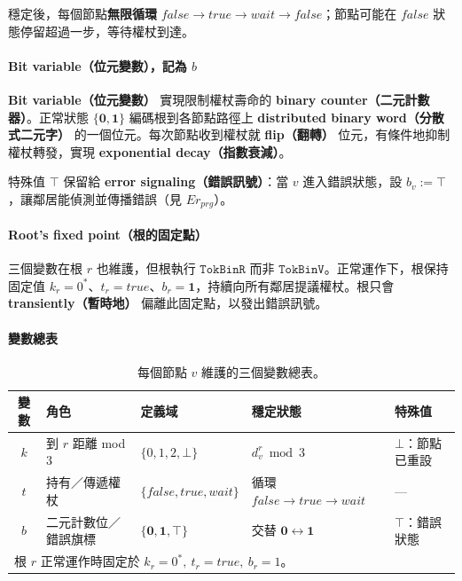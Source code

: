 \documentclass[a4paper, 12pt]{article}
\newcommand{\bz}{\mathbf{0}}
\newcommand{\bo}{\mathbf{1}}
\newcommand{\rk}{k}
\begin{document}
穩定後，每個節點\textbf{無限循環} \(\mathit{false}\to\mathit{true}\to\mathit{wait}\to\mathit{false}\)；節點可能在 \(\mathit{false}\) 狀態停留超過一步，等待權杖到達。

\paragraph{Bit variable（位元變數），記為 \(b\)}
\textbf{Bit variable（位元變數）} 實現限制權杖壽命的 \textbf{binary counter（二元計數器）}。正常狀態 \(\{\bz,\bo\}\) 編碼根到各節點路徑上 \textbf{distributed binary word（分散式二元字）} 的一個位元。每次節點收到權杖就 \textbf{flip（翻轉）} 位元，有條件地抑制權杖轉發，實現 \textbf{exponential decay（指數衰減）}。

特殊值 \(\top\) 保留給 \textbf{error signaling（錯誤訊號）}：當 \(v\) 進入錯誤狀態，設 \(b_v:=\top\)，讓鄰居能偵測並傳播錯誤（見 \(Er_{prg}\)）。

\paragraph{Root's fixed point（根的固定點）}
三個變數在根 \(r\) 也維護，但根執行 \(\mathtt{TokBinR}\) 而非 \(\mathtt{TokBinV}\)。正常運作下，根保持固定值 \(\rk_r=0^*\)、\(t_r=\mathit{true}\)、\(b_r=\bo\)，持續向所有鄰居提議權杖。根只會 \textbf{transiently（暫時地）} 偏離此固定點，以發出錯誤訊號。

\paragraph{變數總表}
\begin{table}[h]
\centering
\renewcommand{\arraystretch}{1.4}
\begin{footnotesize}
\begin{tabular}{c l l l l}
\hline
\textbf{變數} & \textbf{角色} & \textbf{定義域} & \textbf{穩定狀態} & \textbf{特殊值} \\
\hline
\(\rk\) & 到 \(r\) 距離 mod 3 & \(\{0,1,2,\bot\}\) & \(d^r_v\bmod 3\) & \(\bot\)：節點已重設 \\
\(t\) & 持有／傳遞權杖 & \(\{\mathit{false},\mathit{true},\mathit{wait}\}\) & 循環 \(\mathit{false}\!\to\!\mathit{true}\!\to\!\mathit{wait}\) & — \\
\(b\) & 二元計數位／錯誤旗標 & \(\{\bz,\bo,\top\}\) & 交替 \(\bz\leftrightarrow\bo\) & \(\top\)：錯誤狀態 \\
\hline
\multicolumn{5}{l}{\small 根 \(r\) 正常運作時固定於 \(\rk_r=0^*,\ t_r=\mathit{true},\ b_r=1\)。}\\
\hline
\end{tabular}
\end{footnotesize}
\caption{每個節點 \(v\) 維護的三個變數總表。}
\label{tab:variables-zh}
\end{table}
\end{document}

